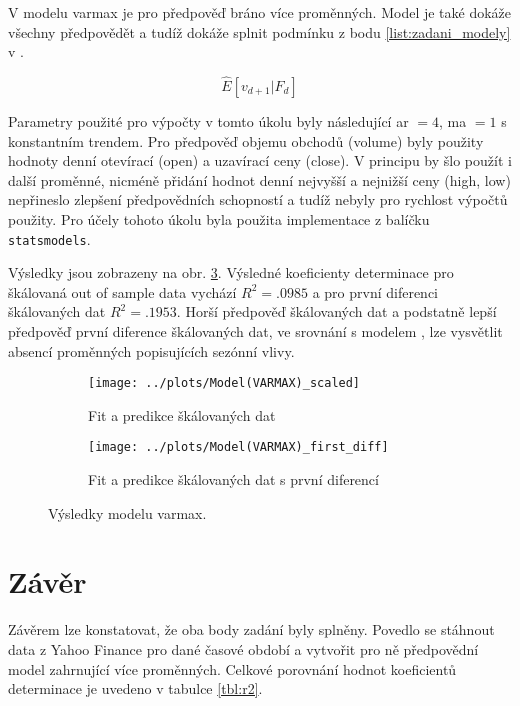\documentclass[a4paper,12pt, czech]{article}
\newcommand{\code}[1]{\texttt{#1}}
\begin{document}
V modelu \gls{varmax} je pro předpověď bráno více proměnných. Model je také dokáže všechny předpovědět a tudíž dokáže splnit podmínku z bodu \ref{list:zadani_modely} v .

\begin{equation}\label{eq:varimax}
\hat{E}\left[v_{d+1}|F_d\right]
\end{equation}

Parametry použité pro výpočty v tomto úkolu byly následující \gls{ar} $= 4$, \gls{ma} $= 1$ s konstantním trendem.
Pro předpověď objemu obchodů (volume) byly použity hodnoty denní otevírací (open) a uzavírací ceny (close).
V principu by šlo použít i další proměnné, nicméně přidání hodnot denní nejvyšší a nejnižší ceny (high, low) nepřineslo zlepšení předpovědních schopností a tudíž nebyly pro rychlost výpočtů použity.
Pro účely tohoto úkolu byla použita implementace z balíčku \code{statsmodels}.

Výsledky jsou zobrazeny na obr. \ref{fig:varmax}.
Výsledné koeficienty determinace pro škálovaná out of sample data vychází $R^2=\num{.0985}$ a pro první diferenci škálovaných dat $R^2=\num{.1953}$.
Horší předpověď škálovaných dat a podstatně lepší předpověď první diference škálovaných dat, ve srovnání s modelem , lze vysvětlit absencí proměnných popisujících sezónní vlivy.

\begin{figure}[htb]
	\begin{subfigure}[t]{.5\linewidth}
		\centering
		\texttt{[image: ../plots/Model(VARMAX)\_scaled]}
		\caption{Fit a predikce škálovaných dat}
		\label{fig:varmax_scaled}
	\end{subfigure}
	\begin{subfigure}[t]{.5\linewidth}
		\centering
		\texttt{[image: ../plots/Model(VARMAX)\_first\_diff]}
		\caption{Fit a predikce škálovaných dat s první diferencí}
		\label{fig:varmax_fd}
	\end{subfigure}
	\caption{Výsledky modelu \gls{varmax}.}\label{fig:varmax}
\end{figure}

\clearpage

\section{Závěr}

Závěrem lze konstatovat, že oba body zadání byly splněny.
Povedlo se stáhnout data z Yahoo Finance pro dané časové období a vytvořit pro ně předpovědní model zahrnující více proměnných.
Celkové porovnání hodnot koeficientů determinace je uvedeno v tabulce \ref{tbl:r2}.
\end{document}
